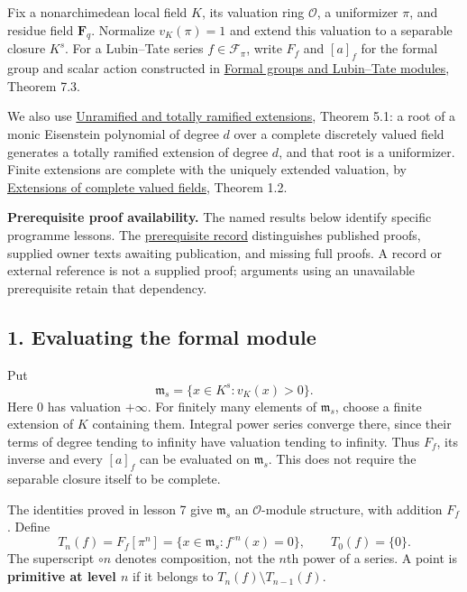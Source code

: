 \documentclass[11pt,a4paper]{article}
\begin{document}
Fix a nonarchimedean local field \(K\), its valuation ring
\(\mathcal O\), a uniformizer \(\pi\), and residue field
\(\mathbf F_q\). Normalize \(v_K(\pi)=1\) and extend this valuation to a
separable closure \(K^s\). For a Lubin--Tate series
\(f\in\mathcal F_\pi\), write \(F_f\) and \([a]_f\) for the formal group
and scalar action constructed in
\href{../formal-groups-and-lubin-tate-modules.html}{Formal groups and
Lubin--Tate modules}, Theorem 7.3.

We also use
\href{https://kokunoyumeto.github.io/open-math-courses/courses/NT-CFT/proof-dependencies.html\#NT-LOC-07}{Unramified
and totally ramified extensions}, Theorem 5.1: a root of a monic
Eisenstein polynomial of degree \(d\) over a complete discretely valued
field generates a totally ramified extension of degree \(d\), and that
root is a uniformizer. Finite extensions are complete with the uniquely
extended valuation, by
\href{https://kokunoyumeto.github.io/open-math-courses/courses/NT-CFT/proof-dependencies.html\#NT-LOC-04}{Extensions
of complete valued fields}, Theorem 1.2.

\textbf{Prerequisite proof availability.} The named results below
identify specific programme lessons. The
\href{https://kokunoyumeto.github.io/open-math-courses/courses/NT-CFT/proof-dependencies.html\#lesson-8}{prerequisite
record} distinguishes published proofs, supplied owner texts awaiting
publication, and missing full proofs. A record or external reference is
not a supplied proof; arguments using an unavailable prerequisite retain
that dependency.

\subsection{1. Evaluating the formal
module}\label{evaluating-the-formal-module}

Put \[
\mathfrak m_s=\{x\in K^s:v_K(x)>0\}.
\] Here \(0\) has valuation \(+\infty\). For finitely many elements of
\(\mathfrak m_s\), choose a finite extension of \(K\) containing them.
Integral power series converge there, since their terms of degree
tending to infinity have valuation tending to infinity. Thus \(F_f\),
its inverse and every \([a]_f\) can be evaluated on \(\mathfrak m_s\).
This does not require the separable closure itself to be complete.

The identities proved in lesson 7 give \(\mathfrak m_s\) an
\(\mathcal O\)-module structure, with addition \(F_f\). Define \[
T_n(f)=F_f[\pi^n]
 =\{x\in\mathfrak m_s:f^{\circ n}(x)=0\},\qquad T_0(f)=\{0\}.
\tag{1}
\] The superscript \(\circ n\) denotes composition, not the \(n\)th
power of a series. A point is \textbf{primitive at level \(n\)} if it
belongs to \(T_n(f)\setminus T_{n-1}(f)\).
\end{document}
